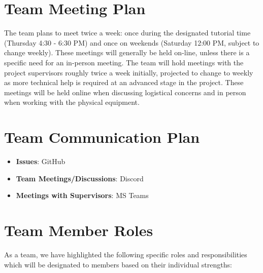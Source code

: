 \documentclass{article}
\begin{document}
\section{Team Meeting Plan}

\hspace{\parindent} The team plans to meet twice a week: once during the designated tutorial time (Thursday 4:30 - 6:30 PM) and once on weekends (Saturday 12:00 PM, subject to change weekly). These meetings will generally be held on-line, unless there is a specific need for an in-person meeting. The team will hold meetings with the project supervisors roughly twice a week initially, projected to change to weekly as more technical help is required at an advanced stage in the project. These meetings will be held online when discussing logistical concerns and in person when working with the physical equipment.

\section{Team Communication Plan}

\begin{itemize}

    \item \textbf{Issues}: GitHub 
    \item \textbf{Team Meetings/Discussions}: Discord
    \item \textbf{Meetings with Supervisors}: MS Teams
    
\end{itemize}

\section{Team Member Roles}

As a team, we have highlighted the following specific roles and responsibilities which will be designated to members based on their individual strengths:
\end{document}
